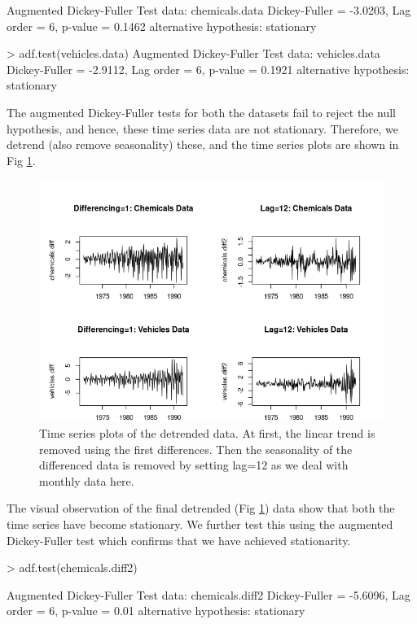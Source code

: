 \begin{enumerate}[label=(\roman*)]
\begin{block}
Augmented Dickey-Fuller Test
data:  chemicals.data
Dickey-Fuller = -3.0203, Lag order = 6, p-value = 0.1462
alternative hypothesis: stationary

> adf.test(vehicles.data)
Augmented Dickey-Fuller Test
data:  vehicles.data
Dickey-Fuller = -2.9112, Lag order = 6, p-value = 0.1921
alternative hypothesis: stationary
\end{block}
\normalsize The augmented Dickey-Fuller tests for both the datasets fail to reject the null hypothesis, and hence, these time series data are not stationary. Therefore, we detrend (also remove seasonality) these, and the time series plots are shown in Fig \ref{fig:diff_plots}.
\begin{figure}[!htb]
    \centering
    \includegraphics[width=\linewidth]{Images/P3/Diff_Plots.png}
    \caption[Time series plots of the detrended data.]{Time series plots of the detrended data. At first, the linear trend is removed using the first differences. Then the seasonality of the differenced data is removed by setting lag=12 as we deal with monthly data here.}
    \label{fig:diff_plots}
\end{figure}

The visual observation of the final detrended (Fig \ref{fig:diff_plots}) data show that both the time series have become stationary. We further test this using the augmented Dickey-Fuller test which confirms that we have achieved stationarity.
\small\begin{block}
> adf.test(chemicals.diff2)

Augmented Dickey-Fuller Test
data:  chemicals.diff2
Dickey-Fuller = -5.6096, Lag order = 6, p-value = 0.01
alternative hypothesis: stationary


\end{block}
\end{enumerate}
